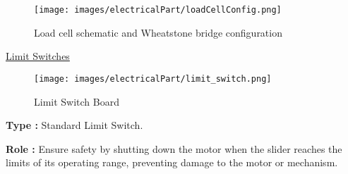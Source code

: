 \documentclass[lettersize,journal]{IEEEtran}
\begin{document}






\begin{figure}[!ht]
    \centering
    \texttt{[image: images/electricalPart/loadCellConfig.png]}
    \caption{\centering Load cell schematic and Wheatstone bridge configuration}
    \label{fig:wheatstone bridge}
\end{figure}

\FloatBarrier


\bigskip

\noindent \underline{Limit Switches}

\begin{figure}[!ht]
    \centering
    \texttt{[image: images/electricalPart/limit\_switch.png]}
    \caption{\centering Limit Switch Board}
    \label{fig:IMU}
\end{figure}

\FloatBarrier

\noindent \textbf{Type :} Standard Limit Switch.

\medskip \noindent \textbf{Role :} Ensure safety by shutting down the motor when the slider reaches the limits of its operating range, preventing damage to the motor or mechanism.

\end{document}

